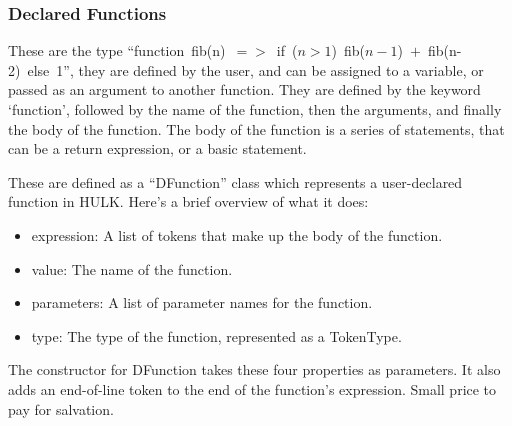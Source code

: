 \subsubsection{Declared Functions}

These are the type \hbox{``function fib{(n)} $=>$ if {($n > 1$)} fib{($n-1$)} $+$ fib{(n-2)} else 1''}, they are defined by the user, and can be assigned to a variable, or passed as an argument to another function. They are defined by the keyword `function', followed by the name of the function, then the arguments, and finally the body of the function. The body of the function is a series of statements, that can be a return expression, or a basic statement.

These are defined as a ``DFunction'' class which represents a user-declared function in HULK. 
Here's a brief overview of what it does:

\begin{itemize}
    \item expression: A list of tokens that make up the body of the function.
    \item value: The name of the function.
    \item parameters: A list of parameter names for the function.
    \item type: The type of the function, represented as a TokenType.
\end{itemize}
The constructor for DFunction takes these four properties as parameters. It also adds an end-of-line token to the end of the function's expression. Small price to pay for salvation.

